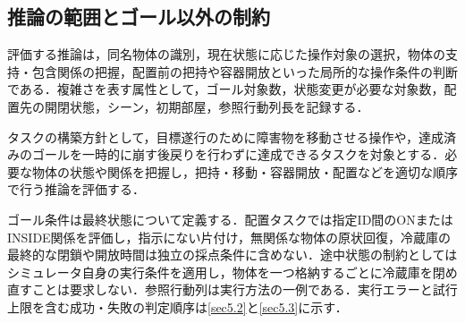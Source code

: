 \subsection{推論の範囲とゴール以外の制約}\label{sec3.scope}
評価する推論は，同名物体の識別，現在状態に応じた操作対象の選択，物体の支持・包含関係の把握，配置前の把持や容器開放といった局所的な操作条件の判断である．複雑さを表す属性として，ゴール対象数，状態変更が必要な対象数，配置先の開閉状態，シーン，初期部屋，参照行動列長を記録する．

タスクの構築方針として，目標遂行のために障害物を移動させる操作や，達成済みのゴールを一時的に崩す後戻りを行わずに達成できるタスクを対象とする．必要な物体の状態や関係を把握し，把持・移動・容器開放・配置などを適切な順序で行う推論を評価する．

ゴール条件は最終状態について定義する．配置タスクでは指定ID間のONまたはINSIDE関係を評価し，指示にない片付け，無関係な物体の原状回復，冷蔵庫の最終的な閉鎖や開放時間は独立の採点条件に含めない．途中状態の制約としてはシミュレータ自身の実行条件を適用し，物体を一つ格納するごとに冷蔵庫を閉め直すことは要求しない．参照行動列は実行方法の一例である．実行エラーと試行上限を含む成功・失敗の判定順序は\ref{sec5.2}と\ref{sec5.3}に示す．
